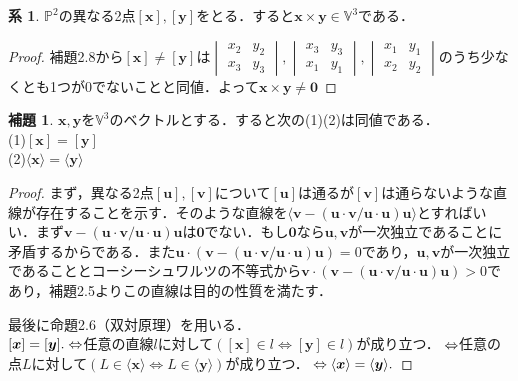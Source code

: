 \documentclass{jsarticle}
\theoremstyle{definition}
\newtheorem{lemma}[theorem]{補題}
\newtheorem{cor}[theorem]{系}
\numberwithin{theorem}{section}
\numberwithin{equation}{section}
\begin{document}
\begin{cor}
    $\mathbb{P}^2$の異なる2点$[\bm{x}],[\bm{y}]$をとる．すると$\bm{x}\times\bm{y}\in\mathbb{V}^3$である．
\end{cor}
\begin{proof}
    補題2.8から$[\bm{x}]\neq[\bm{y}]$は$\begin{vmatrix}
        x_2&y_2\\x_3&y_3
    \end{vmatrix},\begin{vmatrix}
        x_3&y_3\\x_1&y_1
    \end{vmatrix},\begin{vmatrix}
        x_1&y_1\\x_2&y_2
    \end{vmatrix}$のうち少なくとも1つが0でないことと同値．よって$\bm{x}\times\bm{y}\neq\bm{0}$
\end{proof}
\begin{lemma}
    $\bm{x},\bm{y}$を$\mathbb{V}^3$のベクトルとする．すると次の(1)(2)は同値である．
    \\(1)$[\bm{x}]=[\bm{y}]$
    \\(2)$\langle\bm{x}\rangle=\langle\bm{y}\rangle$
\end{lemma}
\begin{proof}まず，異なる2点$[\bm{u}],[\bm{v}]$について$[\bm{u}]$は通るが$[\bm{v}]$は通らないような直線が存在することを示す．そのような直線を$\langle\bm{v}-(\bm{u}\cdot\bm{v}/\bm{u}\cdot\bm{u})\bm{u}\rangle$とすればいい．まず$\bm{v}-(\bm{u}\cdot\bm{v}/\bm{u}\cdot\bm{u})\bm{u}$は$\bm{0}$でない．もし$\bm{0}$なら$\bm{u},\bm{v}$が一次独立であることに矛盾するからである．また$\bm{u}\cdot(\bm{v}-(\bm{u}\cdot\bm{v}/\bm{u}\cdot\bm{u})\bm{u})=0$であり，$\bm{u},\bm{v}$が一次独立であることとコーシーシュワルツの不等式から$\bm{v}\cdot(\bm{v}-(\bm{u}\cdot\bm{v}/\bm{u}\cdot\bm{u})\bm{u})>0$であり，補題2.5よりこの直線は目的の性質を満たす．
\par 最後に命題2.6（双対原理）を用いる．
    \\ \quad$[\bm{x}]=[\bm{y}].\\\Leftrightarrow$任意の直線$l$に対して$([\bm{x}]\in l\Leftrightarrow[\bm{y}]\in l)$が成り立つ．$\\\Leftrightarrow$任意の点$L$に対して$(L\in\langle\bm{x}\rangle\Leftrightarrow L\in\langle\bm{y}\rangle)$が成り立つ．$\\\Leftrightarrow \langle\bm{x}\rangle=\langle\bm{y}\rangle.$
    
\end{proof}
\end{document}
